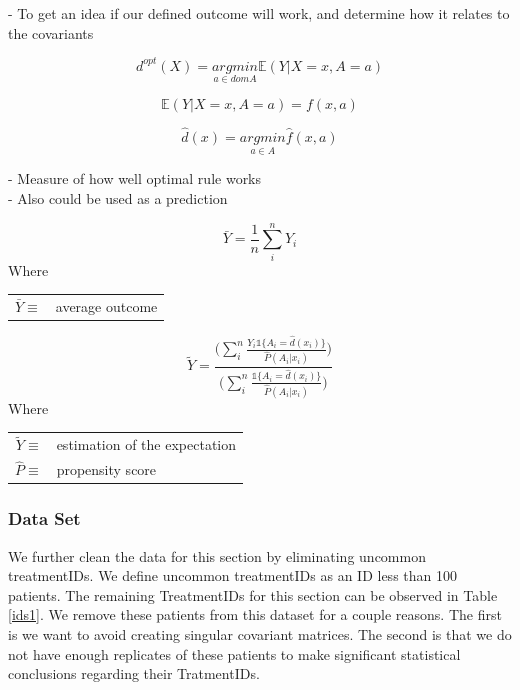 \documentclass[10pt]{article}
\begin{document}
- To get an idea if our defined outcome will work, and determine how it relates to the covariants

\begin{equation}
d^{opt}(X) = \underset{a\in domA}{argmin}\mathds{E} (Y|X=x, A=a)
\end{equation}

\begin{equation}
\mathds{E}(Y|X=x,A=a) = f(x,a)
\end{equation}

\begin{equation}
\hat{d}(x) = \underset{a\in A}{argmin}\hat{f}(x,a)
\end{equation}

- Measure of how well optimal rule works \\
 
- Also could be used as a prediction

\begin{equation}
\bar{Y} = \frac{1}{n}\sum_{i}^{n}Y_i
\end{equation}
Where 
\begin{table}[H]
	\centering
	\begin{tabular}{r l}
		$ \bar{Y} \equiv$ & average outcome \\
	\end{tabular} 
\end{table}

\begin{equation}
\tilde{Y} = \frac{\bigg(\sum_{i}^{n}\frac{Y_i\mathds{1}\{A_i=\hat{d}(x_i)\}}{\hat{P}(A_i|x_i)}\bigg)}{\bigg(\sum_{i}^{n}\frac{\mathds{1}\{A_i=\hat{d}(x_i)\}}{\hat{P}(A_i|x_i)}\bigg)}
\end{equation}
Where 
\begin{table}[H]
	\centering
	\begin{tabular}{r l}
		$ \tilde{Y} \equiv$ & estimation of the expectation\\
		$\hat{P} \equiv$ & propensity score\\
	\end{tabular} 
\end{table}

\subsubsection{Data Set}
We further clean the data for this section by eliminating uncommon treatmentIDs. We define uncommon treatmentIDs as an ID  less than 100 patients. The remaining TreatmentIDs for this section can be observed in Table \ref{ids1}. We remove these patients from this dataset for a couple reasons. The first is we want to avoid creating singular covariant matrices. The second is that we do not have enough replicates of these patients to make significant statistical conclusions regarding their TratmentIDs.
\end{document}
